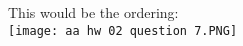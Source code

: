 \documentclass[addpoints,11pt]{exam}
\begin{document}
\begin{questions}
\begin{solutionorbox}
	This would be the ordering: 
\\ \texttt{[image: aa hw 02 question 7.PNG]}
\end{solutionorbox}

\newpage


\end{questions}
\end{document}
